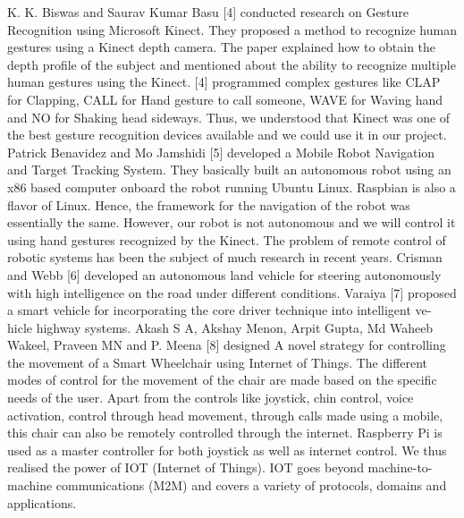 K. K. Biswas and Saurav Kumar Basu [4] conducted research on Gesture Recognition using Microsoft Kinect. They proposed a method to recognize human gestures using a Kinect depth camera. The paper explained how to obtain the depth profile of the subject and mentioned about the ability to recognize multiple human gestures using the Kinect. [4] programmed complex gestures like CLAP for Clapping, CALL for Hand gesture to call someone, WAVE for Waving hand and NO for Shaking head sideways. Thus, we understood that Kinect was one of the best gesture recognition devices available and we could use it in our project.
Patrick Benavidez and Mo Jamshidi [5] developed a Mobile Robot Navigation and Target Tracking System. They basically built an autonomous robot using an x86 based computer onboard the robot running Ubuntu Linux. Raspbian is also a flavor of Linux. Hence, the framework for the navigation of the robot was essentially the same. However, our robot is not autonomous and we will control it using hand gestures recognized by the Kinect. The problem of remote control of robotic systems has been the subject of much research in recent years. Crisman and Webb [6] developed an autonomous land vehicle for steering autonomously with high intelligence on the road under different conditions.
Varaiya [7] proposed a smart vehicle for incorporating the core driver technique into intelligent ve- hicle highway systems. Akash S A, Akshay Menon, Arpit Gupta, Md Waheeb Wakeel, Praveen MN and P. Meena [8] designed A novel strategy for controlling the movement of a Smart Wheelchair using Internet of Things. The different modes of control for the movement of the chair are made based on the specific needs of the user. Apart from the controls like joystick, chin control, voice activation, control through head movement, through calls made using a mobile, this chair can also be remotely controlled through the internet. Raspberry Pi is used as a master controller for both joystick as well as internet control. We thus realised the power of IOT (Internet of Things). IOT goes beyond machine-to-machine communications (M2M) and covers a variety of protocols, domains and applications.
